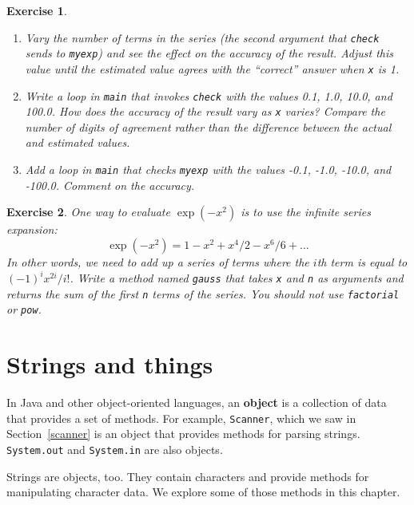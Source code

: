 \documentclass[12pt]{book}
\theoremstyle{exercise}
\newtheorem{exercise}{Exercise}[chapter]
\newcommand{\java}[1]{\verb"#1"}
\newcommand{\java}[1]{\lstinline{#1}} %
\begin{document}
\begin{exercise}
\begin{enumerate}
\item Vary the number of terms in the series (the second argument that \java{check} sends to \java{myexp}) and see the effect on the accuracy of the result.
Adjust this value until the estimated value agrees with the ``correct'' answer when \java{x} is 1.

\item Write a loop in \java{main} that invokes \java{check} with the values 0.1, 1.0, 10.0, and 100.0.
How does the accuracy of the result vary as \java{x} varies?
Compare the number of digits of agreement rather than the difference between the actual and estimated values.

\item Add a loop in \java{main} that checks \java{myexp} with the values -0.1, -1.0, -10.0, and -100.0.
Comment on the accuracy.

\end{enumerate}

\end{exercise}


\begin{exercise}

One way to evaluate $\exp(-x^2)$ is to use the infinite series expansion:
%
\[ \exp(-x^2) = 1 - x^2 + x^4/2 - x^6/6 + \ldots \]
%
In other words, we need to add up a series of terms where the $i$th term is equal to $(-1)^i x^{2i} / i!$.
Write a method named \java{gauss} that takes \java{x} and \java{n} as arguments and returns the sum of the first \java{n} terms of the series.
You should not use \java{factorial} or \java{pow}.

\end{exercise}


\chapter{Strings and things}
\label{strings}


In Java and other object-oriented languages, an {\bf object} is a collection of data that provides a set of methods.
For example, \java{Scanner}, which we saw in Section~\ref{scanner} is an object that provides methods for parsing strings.
\java{System.out} and \java{System.in} are also objects.

Strings are objects, too.
They contain characters and provide methods for manipulating character data.
We explore some of those methods in this chapter.
\end{document}
